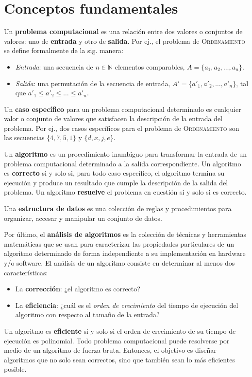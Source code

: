 \chapter{Conceptos fundamentales}

Un \textbf{problema computacional} es una relación entre dos valores o conjuntos de valores: uno de \textbf{entrada} y otro de \textbf{salida}. 
Por ej., el problema de \textsc{Ordenamiento} se define formalmente de la sig. manera:
\begin{itemize}
  \item \emph{Entrada}: una secuencia de \(n\in\mathbb{N}\) elementos comparables, \(A=\{a_1,a_2,\dots,a_n\}\).
  \item \emph{Salida}: una permutación de la secuencia de entrada, \(A'=\{a'_1,a'_2,\dots,a'_n\}\), tal que \(a'_1\leq a'_2\leq\dots\leq a'_n\).
\end{itemize}
Un \textbf{caso específico} para un problema computacional determinado es cualquier valor o conjunto de valores que satisfacen la descripción de la entrada del problema.
Por ej., dos casos específicos para el problema de \textsc{Ordenamiento} son las secuencias \(\{4,7,5,1\}\) y \(\{d,x,j,e\}\).

Un \textbf{algoritmo} es un procedimiento inambiguo para transformar la entrada de un problema computacional determinado a la salida correspondiente.
Un algoritmo es \textbf{correcto} si y solo si, para todo caso específico, el algoritmo termina su ejecución y produce un resultado que cumple la descripción de la salida del problema.
Un algoritmo \textbf{resuelve} el problema en cuestión si y solo si es correcto.

Una \textbf{estructura de datos} es una colección de reglas y procedimientos para organizar, accesar y manipular un conjunto de datos.

Por último, el \textbf{análisis de algoritmos} es la colección de técnicas y herramientas matemáticas que se usan para caracterizar las propiedades particulares de un algoritmo determinado de forma independiente a su implementación en hardware y/o software. 
El análisis de un algoritmo consiste en determinar al menos dos características:
\begin{itemize}
  \item La \textbf{corrección}: ¿el algoritmo es correcto?
  \item La \textbf{eficiencia}: ¿cuál es el \emph{orden de crecimiento} del 
  tiempo de ejecución del algoritmo con respecto al tamaño de la entrada?
\end{itemize}
Un algoritmo es \textbf{eficiente} si y solo si el orden de crecimiento
de su tiempo de ejecución es polinomial.
Todo problema computacional puede resolverse por medio de un algoritmo de fuerza bruta.
Entonces, el objetivo es diseñar algoritmos que no solo sean correctos, sino que también sean lo más eficientes posible.

